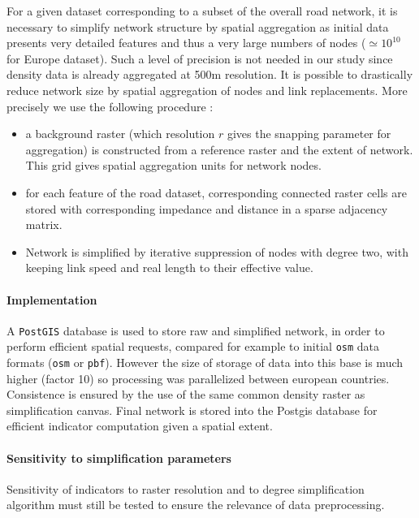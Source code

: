 For a given dataset corresponding to a subset of the overall road network, it is necessary to simplify network structure by spatial aggregation as initial data presents very detailed features and thus a very large numbers of nodes ($\simeq 10^10$ for Europe dataset). Such a level of precision is not needed in our study since density data is already aggregated at 500m resolution. It is possible to drastically reduce network size by spatial aggregation of nodes and link replacements. More precisely we use the following procedure :
\begin{itemize}
\item a background raster (which resolution $r$ gives the snapping parameter for aggregation) is constructed from a reference raster and the extent of network. This grid gives spatial aggregation units for network nodes.
\item for each feature of the road dataset, corresponding connected raster cells are stored with corresponding impedance and distance in a sparse adjacency matrix.
\item Network is simplified by iterative suppression of nodes with degree two, with keeping link speed and real length to their effective value.
\end{itemize}


\paragraph{Implementation}

A \texttt{PostGIS} database is used to store raw and simplified network, in order to perform efficient spatial requests, compared for example to initial \texttt{osm} data formats (\texttt{osm} or \texttt{pbf}). However the size of storage of data into this base is much higher (factor 10) so processing was parallelized between european countries. Consistence is ensured by the use of the same common density raster as simplification canvas. Final network is stored into the Postgis database for efficient indicator computation given a spatial extent.


\paragraph{Sensitivity to simplification parameters}

Sensitivity of indicators to raster resolution and to degree simplification algorithm must still be tested to ensure the relevance of data preprocessing.


